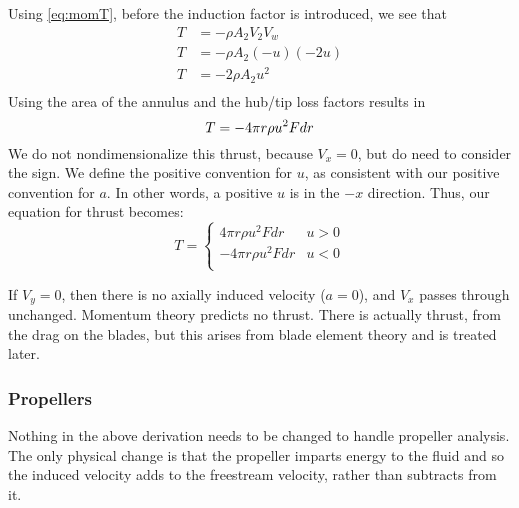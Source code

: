 Using \cref{eq:momT}, before the induction factor is introduced, we see that
\begin{equation}
    \begin{aligned}
        T &= -\rho A_2 V_2 V_w\\
        T &= -\rho A_2 (-u) (-2u)\\
        T &= - 2 \rho A_2 u^2\\
    \end{aligned}
\end{equation}
Using the area of the annulus and the hub/tip loss factors results in
\begin{equation}
    T = - 4 \pi r \rho u^2 F dr\\
\end{equation}
We do not nondimensionalize this thrust, because $V_x = 0$, but do need to consider the sign.  We define the positive convention for $u$, as consistent with our positive convention for $a$.  In other words, a positive $u$ is in the $-x$ direction.  Thus, our equation for thrust becomes:
\begin{equation}
    T =
    \begin{cases}
    4 \pi r \rho u^2 F dr & u > 0\\
    -4 \pi r \rho u^2 F dr & u < 0\\
    \end{cases}
\end{equation}

If $V_y = 0$, then there is no axially induced velocity ($a = 0$), and $V_x$ passes through unchanged. Momentum theory predicts no thrust.  There is actually thrust, from the drag on the blades, but this arises from blade element theory and is treated later.




\subsubsection{Propellers}

Nothing in the above derivation needs to be changed to handle propeller analysis.  The only physical change is that the propeller imparts energy to the fluid and so the induced velocity adds to the freestream velocity, rather than subtracts from it.

